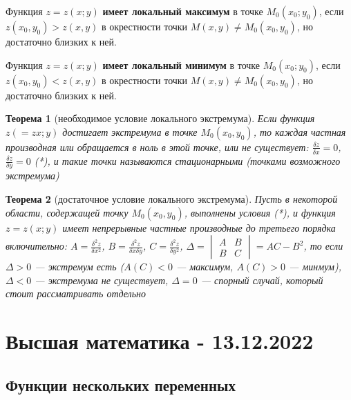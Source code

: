 \documentclass{article}
\newtheorem{theorem}{Теорема}
\begin{document}
\begin{flushleft}
Функция $z = z(x; y)$ \textbf{имеет локальный максимум} в точке $M_0(x_0; y_0)$, если $z(x_0, y_0) > z(x, y)$ в окрестности точки $M(x, y) \ne M_0(x_0, y_0)$, но достаточно близких к ней.

Функция $z = z(x; y)$ \textbf{имеет локальный минимум} в точке $M_0(x_0; y_0)$, если $z(x_0, y_0) < z(x, y)$ в окрестности точки $M(x, y) \ne M_0(x_0, y_0)$, но достаточно близких к ней.

\begin{theorem}[необходимое условие локального экстремума]
    Если функция $z( = zx; y)$ достигает экстремума в точке $M_0(x_0, y_0)$, то каждая частная производная или обращается в ноль в этой точке, или не существует: $\frac{\delta z}{\delta x} = 0$, $\frac{\delta z}{\delta y} = 0$ (*), и такие точки называются стационарными (точками возможного экстремума)
\end{theorem}

\begin{theorem}[достаточное условие локального экстремума]
    Пусть в некоторой области, содержащей точку $M_0(x_0, y_0)$, выполнены условия (*), и функция $z = z(x; y)$ имеет непрерывные частные производные до третьего порядка включительно: $A = \frac{\delta^2 z}{\delta x^2}$, $B = \frac{\delta^2 z}{\delta x \delta y}$, $C = \frac{\delta^2 z}{\delta y^2}$, $\Delta = \begin{vmatrix}
        A & B \\
        B & C
    \end{vmatrix} = AC - B^2$, то если $\Delta > 0$ — экстремум есть ($A(C) < 0$ — максимум, $A(C) > 0$ — минмум), $\Delta < 0$ — экстремума не существует, $\Delta = 0$ — спорный случай, который стоит рассматривать отдельно
\end{theorem}

\end{flushleft}

\pagebreak
\section{Высшая математика - 13.12.2022}

\subsection{Функции нескольких переменных}
\end{document}
